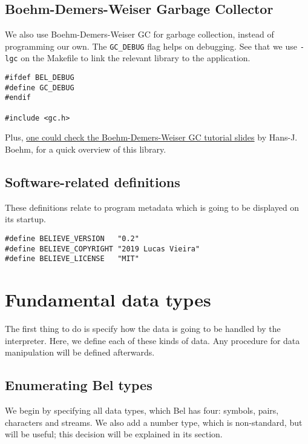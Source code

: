 \documentclass[openright,a4paper,twoside,12pt]{memoir}
\begin{document}
\section{Boehm-Demers-Weiser Garbage Collector}
\label{sec:org046287a}

We also use Boehm-Demers-Weiser GC for garbage collection, instead of
programming our own. The \texttt{GC\_DEBUG} flag helps on debugging. See that we
use \texttt{-lgc} on the Makefile to link the relevant library to the
application.

\begin{verbatim}
#ifdef BEL_DEBUG
#define GC_DEBUG
#endif

#include <gc.h>
\end{verbatim}

Plus, \href{https://www.hboehm.info/gc/04tutorial.pdf}{one could check the Boehm-Demers-Weiser GC tutorial slides} by
Hans-J. Boehm, for a quick overview of this library.

\section{Software-related definitions}
\label{sec:orgf216331}

These definitions relate to program metadata which is going to be
displayed on its startup.

\begin{verbatim}
#define BELIEVE_VERSION   "0.2"
#define BELIEVE_COPYRIGHT "2019 Lucas Vieira"
#define BELIEVE_LICENSE   "MIT"
\end{verbatim}

\chapter{Fundamental data types}
\label{sec:org26c363d}

The first thing to do is specify how the data is going to be handled
by the interpreter. Here, we define each of these kinds of data. Any
procedure for data manipulation will be defined afterwards.

\section{Enumerating Bel types}
\label{sec:org1e38b98}

We begin by specifying all data types, which Bel has four: symbols,
pairs, characters and streams. We also add a number type, which is
non-standard, but will be useful; this decision will be explained in
its section.
\end{document}
